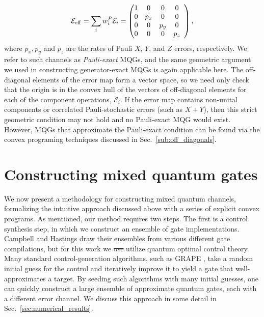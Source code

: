 \documentclass[aps,nofootinbib,pra,notitlepage,twocolumn]{revtex4-1}
\newcommand{\errmat}{\ensuremath{{\mathcal{E}}}}
\newcommand{\0}{\ensuremath{\mathbf{0}}}
\newcommand{\weight}{\ensuremath{w}}
\providecommand{\DIFdeltex}[1]{{\protect\color{red}\sout{#1}}}                      %
\providecommand{\DIFdelbegin}{} %
\providecommand{\DIFdelend}{} %
\providecommand{\DIFdel}[1]{\texorpdfstring{\DIFdeltex{#1}}{}} %
\newcommand{\DIFscaledelfig}{0.5}
\newlength{\DIFdelgraphicswidth} %
\newlength{\DIFdelgraphicsheight} %
\newcommand{\DIFdelincludegraphics}[2][]{%
\sbox{\DIFdelgraphicsbox}{\DIFOincludegraphics[#1]{#2}}%
\settoboxwidth{\DIFdelgraphicswidth}{\DIFdelgraphicsbox} %
\settoboxtotalheight{\DIFdelgraphicsheight}{\DIFdelgraphicsbox} %
\scalebox{\DIFscaledelfig}{%
\parbox[b]{\DIFdelgraphicswidth}{\usebox{\DIFdelgraphicsbox}\\[-\baselineskip] \rule{\DIFdelgraphicswidth}{0em}}\llap{\resizebox{\DIFdelgraphicswidth}{\DIFdelgraphicsheight}{%
\setlength{\unitlength}{\DIFdelgraphicswidth}%
\begin{picture}(1,1)%
\thicklines\linethickness{2pt} %
{\color[rgb]{1,0,0}\put(0,0){\framebox(1,1){}}}%
{\color[rgb]{1,0,0}\put(0,0){\line( 1,1){1}}}%
{\color[rgb]{1,0,0}\put(0,1){\line(1,-1){1}}}%
\end{picture}%
}\hspace*{3pt}}} %
} %
\DeclareRobustCommand{\DIFdelbegin}{\DIFOdelbegin \let\includegraphics\DIFdelincludegraphics} %
\DeclareRobustCommand{\DIFdelend}{\DIFOaddend \let\includegraphics\DIFOincludegraphics} %
\begin{document}
\begin{equation}
	\errmat_{\rm{eff}} = \sum_i \weight_i^P \errmat_i = 
	\left(\begin{array}{@{}ccccc@{}}
		1 & 0 & 0 & 0 \\ 
    	0 &  p_x & 0 & 0 \\
		0 & 0 &  p_y & 0\\
		0 & 0 & 0 &  p_z\\
	\end{array} 	
	\right),
\end{equation}
where $p_x, p_y$ and $p_z$ are the rates of Pauli $X$, $Y$, and $Z$ errors, respectively. We refer to such channels as \emph{Pauli-exact} MQGs, and the same geometric argument we used in constructing generator-exact MQGs is again applicable here. The off-diagonal elements of the error map form a vector space, so we need only check that the origin is in the convex hull of the vectors of off-diagonal elements for each of the component operations, $\errmat_i$. If the error map contains non-unital components or correlated Pauli-stochastic errors (such as $X+Y$), then this strict geometric condition may not hold and no Pauli-exact MQG would exist. However, MQGs that approximate the Pauli-exact condition can be found via the convex programing techniques discussed in Sec.~\ref{sub:off_diagonals}.


\section{Constructing mixed quantum gates}
\label{sec:mixed_unitary_processes}
\noindent We now present a methodology for constructing mixed quantum channels, formalizing the intuitive approach discussed above with a series of explicit convex programs. As mentioned, our method requires two steps. The first is a control synthesis step, in which we construct an ensemble of gate implementations. Campbell and Hastings draw their ensembles from various different gate compilations, but for this work we \DIFdelbegin \DIFdel{use }\DIFdelend utilize quantum optimal control theory. Many standard control-generation algorithms, such as GRAPE \cite{Khaneja2005}, take a random initial guess for the control and iteratively improve it to yield a gate that well-approximates a target. By seeding such algorithms with many initial guesses, one can quickly construct a large ensemble of approximate quantum gates, each with a different error channel. We discuss this approach in some detail in Sec.~\ref{sec:numerical_results}. 
\end{document}
